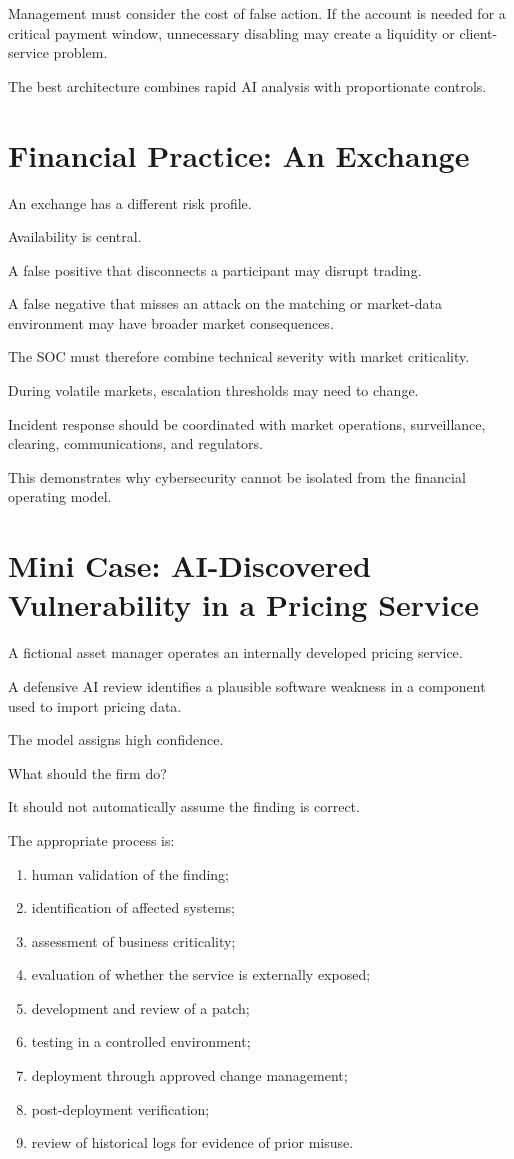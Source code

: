 Management must consider the cost of false action. If the account is needed for a critical payment window, unnecessary disabling may create a liquidity or client-service problem.

The best architecture combines rapid AI analysis with proportionate controls.

\section{Financial Practice: An Exchange}

An exchange has a different risk profile.

Availability is central.

A false positive that disconnects a participant may disrupt trading.

A false negative that misses an attack on the matching or market-data environment may have broader market consequences.

The SOC must therefore combine technical severity with market criticality.

During volatile markets, escalation thresholds may need to change.

Incident response should be coordinated with market operations, surveillance, clearing, communications, and regulators.

This demonstrates why cybersecurity cannot be isolated from the financial operating model.

\section{Mini Case: AI-Discovered Vulnerability in a Pricing Service}

A fictional asset manager operates an internally developed pricing service.

A defensive AI review identifies a plausible software weakness in a component used to import pricing data.

The model assigns high confidence.

What should the firm do?

It should not automatically assume the finding is correct.

The appropriate process is:

\begin{enumerate}
    \item human validation of the finding;
    \item identification of affected systems;
    \item assessment of business criticality;
    \item evaluation of whether the service is externally exposed;
    \item development and review of a patch;
    \item testing in a controlled environment;
    \item deployment through approved change management;
    \item post-deployment verification;
    \item review of historical logs for evidence of prior misuse.
\end{enumerate}

